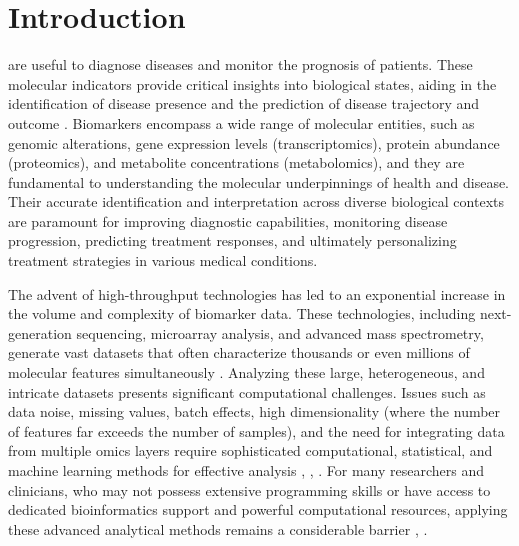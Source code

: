 \documentclass[journal]{IEEEtran}
\begin{document}
\IEEEdisplaynontitleabstractindextext


\IEEEpeerreviewmaketitle

\section{Introduction}

 are useful to diagnose diseases and monitor the prognosis of patients. These molecular indicators provide critical insights into biological states, aiding in the identification of disease presence and the prediction of disease trajectory and outcome \cite{Zheng2020_CancerReview}. Biomarkers encompass a wide range of molecular entities, such as genomic alterations, gene expression levels (transcriptomics), protein abundance (proteomics), and metabolite concentrations (metabolomics), and they are fundamental to understanding the molecular underpinnings of health and disease. Their accurate identification and interpretation across diverse biological contexts are paramount for improving diagnostic capabilities, monitoring disease progression, predicting treatment responses, and ultimately personalizing treatment strategies in various medical conditions.

The advent of high-throughput technologies has led to an exponential increase in the volume and complexity of biomarker data. These technologies, including next-generation sequencing, microarray analysis, and advanced mass spectrometry, generate vast datasets that often characterize thousands or even millions of molecular features simultaneously \cite{MetaboAnalyst_2009, MetaboAnalystR_2018, MetaboLink_2024, WebSpecmine_2019, MOMIC_2022, Gruca2022_MAINE, Lu2024_GenoCraft, MiBiOmics_2021}. Analyzing these large, heterogeneous, and intricate datasets presents significant computational challenges. Issues such as data noise, missing values, batch effects, high dimensionality (where the number of features far exceeds the number of samples), and the need for integrating data from multiple omics layers require sophisticated computational, statistical, and machine learning methods for effective analysis \cite{MOMIC_2022}, \cite{Multiomix_2022}, \cite{exploRase_2006}. For many researchers and clinicians, who may not possess extensive programming skills or have access to dedicated bioinformatics support and powerful computational resources, applying these advanced analytical methods remains a considerable barrier \cite{exploRase_2006}, \cite{XCMSOnline_2012}.
\end{document}
